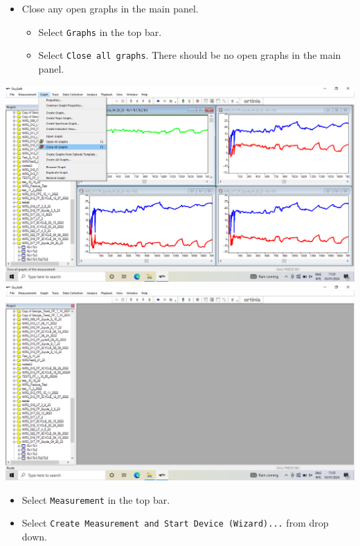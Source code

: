 \documentclass[
]{book}
\providecommand{\tightlist}{%
  \setlength{\itemsep}{0pt}\setlength{\parskip}{0pt}}
\begin{document}
\begin{itemize}
\tightlist
\item
  Close any open graphs in the main panel.

  \begin{itemize}
  \tightlist
  \item
    Select \texttt{Graphs} in the top bar.\\
  \item
    Select \texttt{Close\ all\ graphs}. There should be no open graphs in the main panel.
  \end{itemize}
\end{itemize}

\includegraphics[width=1\linewidth]{images/startnewmeasurement/02_select_close_all_graphs}
\includegraphics[width=1\linewidth]{images/startnewmeasurement/03_closed_all_graphs}

\begin{itemize}
\tightlist
\item
  Select \texttt{Measurement} in the top bar.
\item
  Select \texttt{Create\ Measurement\ and\ Start\ Device\ (Wizard)...} from drop down.
\end{itemize}
\end{document}
